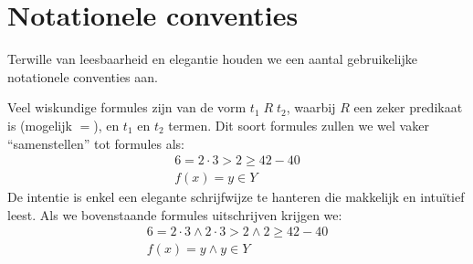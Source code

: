 \section{Notationele conventies}
\label{sec:conventies}

Terwille van leesbaarheid en elegantie houden we een aantal gebruikelijke notationele conventies aan.

Veel wiskundige formules zijn van de vorm $t_1\; R\; t_2$, waarbij $R$ een zeker predikaat is (mogelijk $=$), en $t_1$ en $t_2$ termen. Dit soort formules zullen we wel vaker “samenstellen” tot formules als:
\begin{gather*}
  6 = 2 \cdot 3 > 2 \ge 42 - 40 \\
  f(x) = y \in Y
\end{gather*}
De intentie is enkel een elegante schrijfwijze te hanteren die makkelijk en intuïtief leest.
Als we bovenstaande formules uitschrijven krijgen we:
\begin{gather*}
  6 = 2 \cdot 3 \land 2 \cdot 3 > 2 \land 2 \ge 42 - 40 \\
  f(x) = y \land y \in Y
\end{gather*}

